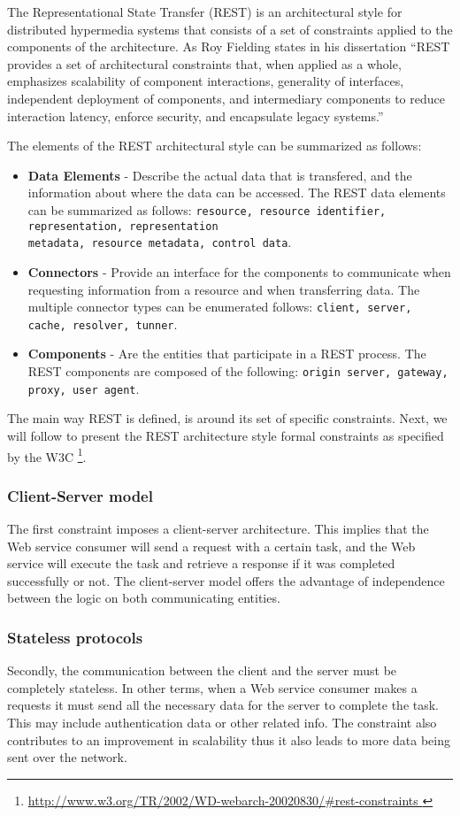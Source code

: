 The Representational State Transfer (REST) is an architectural style for distributed hypermedia systems that  consists of a set of constraints applied to the components of the architecture.
As Roy Fielding states in his dissertation \cite{fielding} ``REST provides a set of architectural constraints that, when applied as a whole, emphasizes scalability of component interactions, generality of interfaces, independent deployment of components, and intermediary components to reduce interaction latency, enforce security, and encapsulate legacy systems.''

The elements of the REST architectural style can be summarized as follows:
\begin{itemize}
	\item \textbf{Data Elements} - Describe the actual data that is transfered, and the information about where the data can be accessed. The REST data elements can be summarized as follows: \texttt{resource, resource identifier, representation, representation\\ metadata, resource metadata, control data}.
	\item \textbf{Connectors} - Provide an interface for the components to communicate when requesting information from a  resource and when transferring data. The multiple connector types can be enumerated follows: \texttt{client, server, cache, resolver, tunner}.
	\item \textbf{Components} - Are the entities that participate in a REST process. The REST components are composed of the following: \texttt{origin server, gateway, proxy, user agent}.
\end{itemize}
The main way REST is defined, is around its set of specific constraints. Next, we will follow to present the REST architecture style formal constraints as specified by the W3C \footnote{\url{http://www.w3.org/TR/2002/WD-webarch-20020830/\#rest-constraints  }}.
\subsubsection{Client-Server model}
The first constraint imposes a client-server architecture. This implies that the Web service consumer will send a request with a certain task, and the Web service will execute the task and retrieve a response if it was completed successfully or not. The client-server model offers the advantage of independence between the logic on both communicating entities.
\subsubsection{Stateless protocols}
Secondly, the communication between the client and the server must be completely stateless. In other terms, when a Web service consumer makes a requests it must send all the necessary data for the server to complete the task. This may include authentication data or other related info. The constraint also contributes to an improvement in scalability thus it also leads to more data being sent over the network. 
